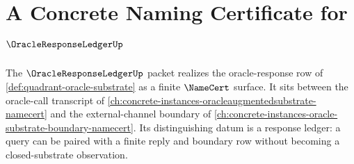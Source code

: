 \chapter{A Concrete Naming Certificate for $\OracleResponseLedgerUp$}
\label{ch:concrete-instances-oracleresponseledger-namecert}

The $\OracleResponseLedgerUp$ packet realizes the oracle-response row of
\autoref{def:quadrant-oracle-substrate} as a finite $\NameCert$ surface. It
sits between the oracle-call transcript of
\autoref{ch:concrete-instances-oracleaugmentedsubstrate-namecert} and the
external-channel boundary of
\autoref{ch:concrete-instances-oracle-substrate-boundary-namecert}. Its
distinguishing datum is a response ledger: a query can be paired with a finite
reply and boundary row without becoming a closed-substrate observation.



